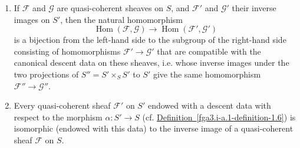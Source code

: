   
 \begin{enumerate}
    
 \item[i.]
      If \(\mathcal {F}\) and \(\mathscr {G}\) are quasi-coherent sheaves on \(S\), and \(\mathcal {F}'\) and \(\mathscr {G}'\) their inverse images on \(S'\), then the natural homomorphism
      \[         \operatorname {Hom}(\mathcal {F},\mathscr {G}) \to  \operatorname {Hom}(\mathcal {F}',\mathscr {G}')       \]
      is a bijection from the left-hand side to the subgroup of the right-hand side consisting of homomorphisms \(\mathcal {F}'\to \mathscr {G}'\) that are compatible with the canonical descent data on these sheaves, i.e. whose inverse images under the two projections of \(S''=S'\times _S S'\) to \(S'\) give the same homomorphism \(\mathcal {F}''\to \mathscr {G}''\).
    

    
 \item[ii.]
      Every quasi-coherent sheaf \(\mathcal {F}'\) on \(S'\) endowed with a descent data with respect to the morphism \(\alpha \colon  S'\to  S\) (cf. \hyperref[fga3.i-a.1-definition-1.6]{Definition~\ref*{fga3.i-a.1-definition-1.6}}) is isomorphic (endowed with this data) to the inverse image of a quasi-coherent sheaf \(\mathcal {F}\) on \(S\).
    

  \end{enumerate}


